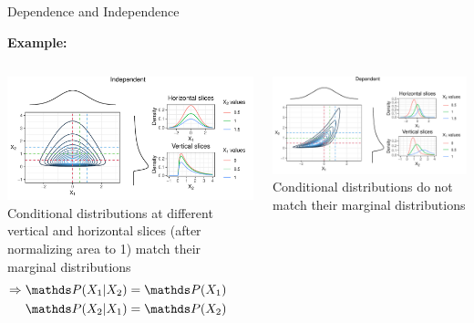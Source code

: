 \documentclass[10pt,compress,t,notes=noshow, xcolor=table]{beamer}
\begin{document}
\begin{frame}{Dependence and Independence}
	
\textbf{Example:}
\begin{columns}[T, totalwidth=\linewidth]
\begin{column}{0.49\linewidth}
\includegraphics[width=\linewidth]{figure/independent_slice.pdf}
Conditional distributions at different vertical and horizontal slices (after normalizing area to 1) match their marginal distributions
\begin{align*}
    \Rightarrow \P(X_1|X_2) &= \P(X_1) \hspace{2.5cm} \\ 
    \P(X_2|X_1) &= \P(X_2)
\end{align*}
\end{column}
\hfill\pause
\begin{column}{0.49\linewidth}
\includegraphics[width=\linewidth]{figure/dependent_slice.pdf}
Conditional distributions do not match their marginal distributions
\end{column}
\end{columns}


\end{frame}
\end{document}
